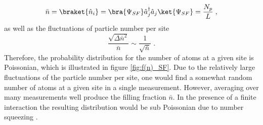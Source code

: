 \begin{equation}
	\bar{n} = \braket{\hat{n}_i} = \bra{\Psi_{SF}} \hat{a}_{j}^{\dag} \hat{a}_{j} \ket{\Psi_{SF}} = \frac{N_p}{L} \; ,
\end{equation}
as well as the fluctuations of particle number per site
\begin{equation}
	\frac{\sqrt{\Delta \bar{n}^2}}{\bar{n}} \sim \frac{1}{\sqrt{\bar{n}}} \; .
\end{equation}
Therefore, the probability distribution for the number of atoms at a given site is Poissonian, which is illustrated in figure \ref{fig:f(n)_SF}. Due to the relatively large fluctuations of the particle number per site, one would find a somewhat random number of atoms at a given site in a single measurement. However, averaging over many measurements well produce the filling fraction $\bar{n}$. In the presence of a finite interaction the resulting distribution would be sub Poissonian due to number squeezing \cite{greiner}.


